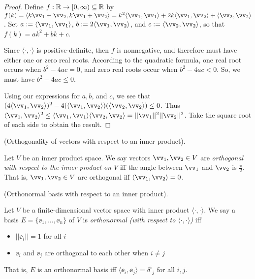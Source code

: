 \begin{proof}
    Define $f:\mathbb{R} \rightarrow [0, \infty) \subseteq \mathbb{R}$ by $f(k) = \langle k \vv_1 + \vv_2, k \vv_1 + \vv_2 \rangle = k^2 \langle \vv_1, \vv_1 \rangle + 2 k \langle \vv_1, \vv_2 \rangle + \langle \vv_2, \vv_2 \rangle$. Set $a := \langle \vv_1, \vv_1 \rangle$, $b := 2 \langle \vv_1, \vv_2 \rangle$, and $c := \langle \vv_2, \vv_2 \rangle$, so that $f(k) = ak^2 + bk + c$.
    
    Since $\langle \cdot, \cdot \rangle$ is positive-definite, then $f$ is nonnegative, and therefore must have either one or zero real roots. According to the quadratic formula, one real root occurs when $b^2 - 4ac = 0$, and zero real roots occur when $b^2 - 4ac < 0$. So, we must have $b^2 - 4ac \leq 0$. 
    
    Using our expressions for $a, b$, and $c$, we see that $(4 \langle \vv_1, \vv_2 \rangle)^2 - 4(\langle \vv_1, \vv_2 \rangle)(\langle \vv_2, \vv_2 \rangle) \leq 0$. Thus \\ ${\langle \vv_1, \vv_2 \rangle^2 \leq \langle \vv_1, \vv_1 \rangle \langle \vv_2, \vv_2 \rangle = ||\vv_1||^2 ||\vv_2||^2}$. Take the square root of each side to obtain the result.  
\end{proof}

\begin{defn}
    (Orthogonality of vectors with respect to an inner product). 
    
    Let $V$ be an inner product space. We say vectors $\vv_1, \vv_2 \in V$ are \textit{orthogonal with respect to the inner product on $V$} iff the angle between $\vv_1$ and $\vv_2$ is $\frac{\pi}{2}$. That is, $\vv_1, \vv_2 \in V$ are orthogonal iff $\langle \vv_1, \vv_2 \rangle = 0$.
\end{defn}

\begin{defn}
    (Orthonormal basis with respect to an inner product).
    
     Let $V$ be a finite-dimensional vector space with inner product $\langle \cdot, \cdot \rangle$. We say a basis $E = \{\ee_1, ..., \ee_n\}$ of $V$ is \textit{orthonormal (with respect to $\langle \cdot, \cdot \rangle$)} iff
     
     \begin{itemize}
         \item $||\ee_i|| = 1$ for all $i$
         \item $\ee_i$ and $\ee_j$ are orthogonal to each other when $i \neq j$
     \end{itemize}
     
     That is, $E$ is an orthonormal basis iff $\langle \ee_i, \ee_j \rangle = \delta^i{}_j$ for all $i, j$.
\end{defn}

